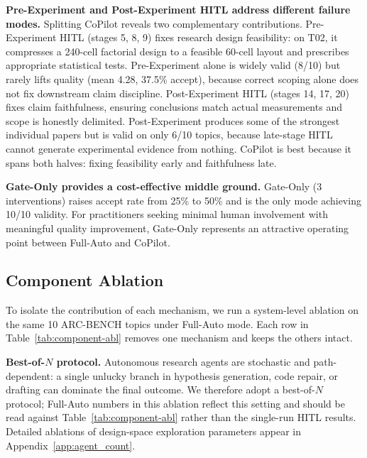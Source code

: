\noindent \textbf{Pre-Experiment and Post-Experiment HITL address different failure modes.} Splitting CoPilot reveals two complementary contributions. Pre-Experiment HITL (stages 5, 8, 9) fixes research design feasibility: on T02, it compresses a 240-cell factorial design to a feasible 60-cell layout and prescribes appropriate statistical tests. Pre-Experiment alone is widely valid (8/10) but rarely lifts quality (mean 4.28, 37.5\% accept), because correct scoping alone does not fix downstream claim discipline. Post-Experiment HITL (stages 14, 17, 20) fixes claim faithfulness, ensuring conclusions match actual measurements and scope is honestly delimited. Post-Experiment produces some of the strongest individual papers but is valid on only 6/10 topics, because late-stage HITL cannot generate experimental evidence from nothing. CoPilot is best because it spans both halves: fixing feasibility early and faithfulness late.

\noindent \textbf{Gate-Only provides a cost-effective middle ground.} Gate-Only (3 interventions) raises accept rate from 25\% to 50\% and is the only mode achieving 10/10 validity. For practitioners seeking minimal human involvement with meaningful quality improvement, Gate-Only represents an attractive operating point between Full-Auto and CoPilot.

\vspace{-0.3em}
\subsection{Component Ablation}
\label{sec:component_abl}
\vspace{-0.3em}

To isolate the contribution of each mechanism, we run a system-level ablation on the same 10 ARC-BENCH topics under Full-Auto mode. Each row in Table~\ref{tab:component-abl} removes one mechanism and keeps the others intact.

\noindent \textbf{Best-of-$N$ protocol.}
Autonomous research agents are stochastic and path-dependent: a single unlucky branch in hypothesis generation, code repair, or drafting can dominate the final outcome. We therefore adopt a best-of-$N$ protocol; Full-Auto numbers in this ablation reflect this setting and should be read against Table~\ref{tab:component-abl} rather than the single-run HITL results. Detailed ablations of design-space exploration parameters appear in Appendix~\ref{app:agent_count}.

